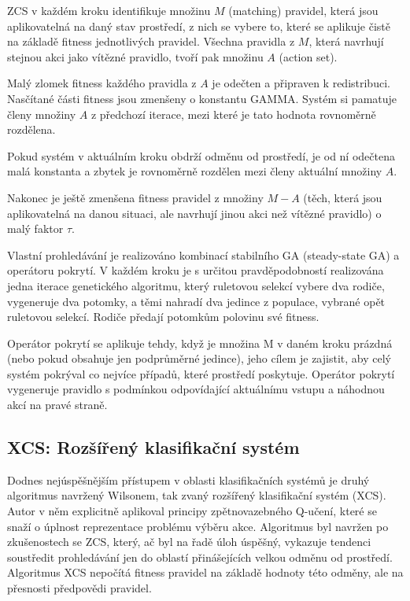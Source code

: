 ZCS v každém kroku identifikuje množinu $M$ (matching) pravidel, která jsou aplikovatelná na daný stav prostředí, z nich se vybere to, které se aplikuje čistě na základě fitness jednotlivých pravidel. Všechna pravidla z $M$, která navrhují stejnou akci jako vítězné pravidlo, tvoří pak množinu $A$ (action set). 

Malý zlomek fitness každého pravidla z $A$ je odečten a připraven k redistribuci. Nasčítané části fitness jsou zmenšeny o konstantu GAMMA. Systém si pamatuje členy množiny $A$ z předchozí iterace, mezi které je tato hodnota rovnoměrně rozdělena. 

Pokud systém v aktuálním kroku obdrží odměnu od prostředí, je od ní odečtena malá konstanta a zbytek je rovnoměrně rozdělen mezi členy aktuální množiny $A$. 

Nakonec je ještě zmenšena fitness pravidel z množiny $M-A$ (těch, která jsou aplikovatelná na danou situaci, ale navrhují jinou akci než vítězné pravidlo) o malý faktor $\tau$. 

Vlastní prohledávání je realizováno kombinací stabilního GA (steady-state GA) a operátoru pokrytí. V každém kroku je s určitou pravděpodobností realizována jedna iterace genetického algoritmu, který ruletovou selekcí vybere dva rodiče, vygeneruje dva potomky, a těmi nahradí dva jedince z populace, vybrané opět ruletovou selekcí. Rodiče předají potomkům polovinu své fitness.

Operátor pokrytí se aplikuje tehdy, když je množina M v daném kroku prázdná (nebo pokud obsahuje jen podprůměrné jedince), jeho cílem je zajistit, aby celý systém pokrýval co nejvíce případů, které prostředí poskytuje. Operátor pokrytí vygeneruje pravidlo s podmínkou odpovídající aktuálnímu vstupu a náhodnou akcí na pravé straně. 

\subsection{XCS: Rozšířený klasifikační systém}

Dodnes nejúspěšnějším přístupem v oblasti klasifikačních systémů je druhý algoritmus navržený Wilsonem, tak zvaný rozšířený klasifikační systém (XCS). Autor v něm explicitně aplikoval principy zpětnovazebného Q-učení, které se snaží o úplnost reprezentace problému výběru akce. Algoritmus byl navržen po zkušenostech se ZCS, který, ač byl na řadě úloh úspěšný, vykazuje tendenci soustředit prohledávání jen do oblastí přinášejících velkou odměnu od prostředí. 
Algoritmus XCS nepočítá fitness pravidel na základě hodnoty této odměny, ale na přesnosti předpovědi pravidel. 

